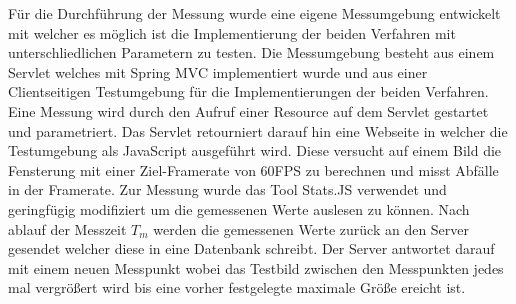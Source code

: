 Für die Durchführung der Messung wurde eine eigene Messumgebung entwickelt mit welcher es möglich ist die Implementierung der beiden Verfahren mit unterschliedlichen Parametern zu testen.
Die Messumgebung besteht aus einem Servlet welches mit Spring MVC implementiert wurde und aus einer Clientseitigen Testumgebung für die Implementierungen der beiden Verfahren.
Eine Messung wird durch den Aufruf einer Resource auf dem Servlet gestartet und parametriert.
Das Servlet retourniert darauf hin eine Webseite in welcher die Testumgebung als JavaScript ausgeführt wird.
Diese versucht auf einem Bild die Fensterung mit einer Ziel-Framerate von 60FPS zu berechnen und misst Abfälle in der Framerate.
Zur Messung wurde das Tool Stats.JS verwendet und geringfügig modifiziert um die gemessenen Werte auslesen zu können.
Nach ablauf der Messzeit $T_m$ werden die gemessenen Werte zurück an den Server gesendet welcher diese in eine Datenbank schreibt.
Der Server antwortet darauf mit einem neuen Messpunkt wobei das Testbild zwischen den Messpunkten jedes mal vergrößert wird bis eine vorher festgelegte maximale Größe ereicht ist.

